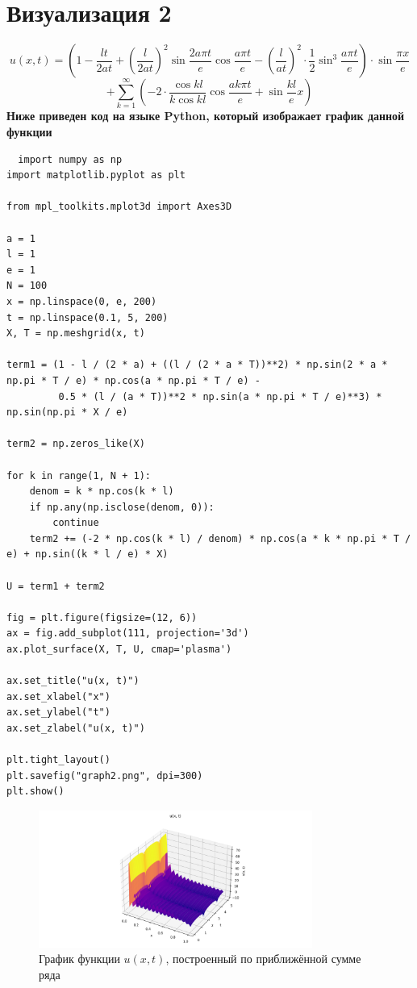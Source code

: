 \documentclass[a4paper,12pt]{article}
\begin{document}
\section{Визуализация 2}
$$u(x,t) = \left(1 - \frac{lt}{2at} + \left(\frac{l}{2at}\right)^2 \sin \frac{2a\pi t}{e} \cos \frac{a\pi t}{e} - \left(\frac{l}{at}\right)^2 \cdot \frac{1}{2} \sin^3 \frac{a\pi t}{e} \right) \cdot \sin \frac{\pi x}{e}$$
$$ + \sum_{k=1}^{\infty} \left( -2 \cdot \frac{\cos kl}{k \cos kl} \cos \frac{a k \pi t}{e} + \sin \frac{kl}{e} x \right)$$
\textbf{Ниже приведен код на языке Python, который изображает график данной функции}
\begin{lstlisting}
  import numpy as np
import matplotlib.pyplot as plt

from mpl_toolkits.mplot3d import Axes3D

a = 1
l = 1
e = 1
N = 100  
x = np.linspace(0, e, 200)
t = np.linspace(0.1, 5, 200)
X, T = np.meshgrid(x, t)

term1 = (1 - l / (2 * a) + ((l / (2 * a * T))**2) * np.sin(2 * a * np.pi * T / e) * np.cos(a * np.pi * T / e) -
         0.5 * (l / (a * T))**2 * np.sin(a * np.pi * T / e)**3) * np.sin(np.pi * X / e)

term2 = np.zeros_like(X)

for k in range(1, N + 1):
    denom = k * np.cos(k * l)
    if np.any(np.isclose(denom, 0)):
        continue
    term2 += (-2 * np.cos(k * l) / denom) * np.cos(a * k * np.pi * T / e) + np.sin((k * l / e) * X)

U = term1 + term2

fig = plt.figure(figsize=(12, 6))
ax = fig.add_subplot(111, projection='3d')
ax.plot_surface(X, T, U, cmap='plasma')

ax.set_title("u(x, t)")
ax.set_xlabel("x")
ax.set_ylabel("t")
ax.set_zlabel("u(x, t)")

plt.tight_layout()
plt.savefig("graph2.png", dpi=300)
plt.show()

\end{lstlisting}
\begin{figure}[H]
    \centering
    \includegraphics[width=0.8\textwidth]{../graph2.png}
    \caption{График функции $u(x,t)$, построенный по приближённой сумме ряда}
\end{figure}
\end{document}
